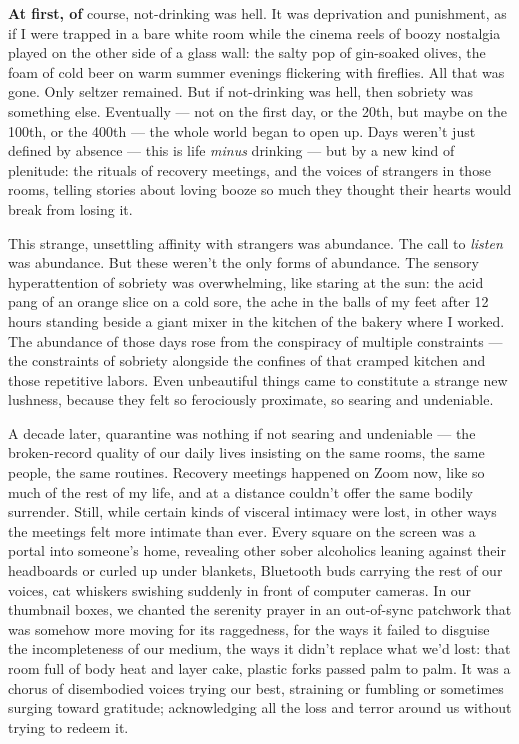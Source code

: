 \textbf{At first, of} course, not-drinking was hell. It was deprivation
and punishment, as if I were trapped in a bare white room while the
cinema reels of boozy nostalgia played on the other side of a glass
wall: the salty pop of gin-soaked olives, the foam of cold beer on warm
summer evenings flickering with fireflies. All that was gone. Only
seltzer remained. But if not-drinking was hell, then sobriety was
something else. Eventually --- not on the first day, or the 20th, but
maybe on the 100th, or the 400th --- the whole world began to open up.
Days weren't just defined by absence --- this is life \emph{minus}
drinking --- but by a new kind of plenitude: the rituals of recovery
meetings, and the voices of strangers in those rooms, telling stories
about loving booze so much they thought their hearts would break from
losing it.

This strange, unsettling affinity with strangers was abundance. The call
to \emph{listen} was abundance. But these weren't the only forms of
abundance. The sensory hyperattention of sobriety was overwhelming, like
staring at the sun: the acid pang of an orange slice on a cold sore, the
ache in the balls of my feet after 12 hours standing beside a giant
mixer in the kitchen of the bakery where I worked. The abundance of
those days rose from the conspiracy of multiple constraints --- the
constraints of sobriety alongside the confines of that cramped kitchen
and those repetitive labors. Even unbeautiful things came to constitute
a strange new lushness, because they felt so ferociously proximate, so
searing and undeniable.

A decade later, quarantine was nothing if not searing and undeniable ---
the broken-record quality of our daily lives insisting on the same
rooms, the same people, the same routines. Recovery meetings happened on
Zoom now, like so much of the rest of my life, and at a distance
couldn't offer the same bodily surrender. Still, while certain kinds of
visceral intimacy were lost, in other ways the meetings felt more
intimate than ever. Every square on the screen was a portal into
someone's home, revealing other sober alcoholics leaning against their
headboards or curled up under blankets, Bluetooth buds carrying the rest
of our voices, cat whiskers swishing suddenly in front of computer
cameras. In our thumbnail boxes, we chanted the serenity prayer in an
out-of-sync patchwork that was somehow more moving for its raggedness,
for the ways it failed to disguise the incompleteness of our medium, the
ways it didn't replace what we'd lost: that room full of body heat and
layer cake, plastic forks passed palm to palm. It was a chorus of
disembodied voices trying our best, straining or fumbling or sometimes
surging toward gratitude; acknowledging all the loss and terror around
us without trying to redeem it.


